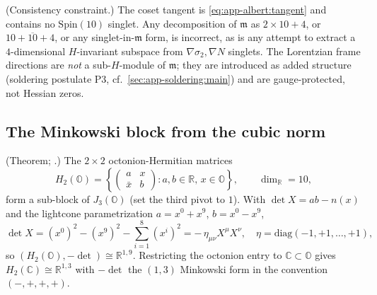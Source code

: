\begin{remark}\label{rmk:app-albert:forbidden}
\textup{(Consistency constraint.)}
The coset tangent is \eqref{eq:app-albert:tangent} and contains no
$\mathrm{Spin}(10)$ singlet. Any decomposition of $\mathfrak m$ as $2\times10+4$,
or $10+\overline{10}+4$, or any singlet-in-$\mathfrak m$ form, is incorrect, as is
any attempt to extract a $4$-dimensional $H$-invariant subspace from
$\nabla\sigma_2,\nabla N$ singlets. The Lorentzian frame directions are
\emph{not} a sub-$H$-module of $\mathfrak m$; they are introduced as added
structure (soldering postulate P3, cf.\ \autoref{sec:app-soldering:main}) and are
gauge-protected, not Hessian zeros.
\end{remark}

\subsection{The Minkowski block from the cubic norm}
\label{sec:app-albert:minkowski}

\begin{theorem}\label{thm:app-albert:minkowski}
\textup{(Theorem; \cite{Baez:2002,Sudbery:1984}.)}
The $2\times2$ octonion-Hermitian matrices
\begin{equation}\label{eq:app-albert:H2O}
  H_2(\mathbb O)=
  \left\{\begin{pmatrix}a & x\\ \bar x & b\end{pmatrix}:a,b\in\mathbb R,\,x\in
  \mathbb O\right\},
  \qquad \dim_{\mathbb R}=10,
\end{equation}
form a sub-block of $J_3(\mathbb O)$ (set the third pivot to $1$). With
$\det X=ab-n(x)$ and the lightcone parametrization $a=x^0+x^9$, $b=x^0-x^9$,
\begin{equation}\label{eq:app-albert:detmink}
  \det X=(x^0)^2-(x^9)^2-\textstyle\sum_{i=1}^{8}(x^i)^2
  =-\,\eta_{\mu\nu}X^\mu X^\nu,
  \quad \eta=\mathrm{diag}(-1,+1,\dots,+1),
\end{equation}
so $(H_2(\mathbb O),-\det)\cong\mathbb R^{1,9}$. Restricting the octonion entry to
$\mathbb C\subset\mathbb O$ gives $H_2(\mathbb C)\cong\mathbb R^{1,3}$ with
$-\det$ the $(1,3)$ Minkowski form in the convention $(-,+,+,+)$.
\end{theorem}

